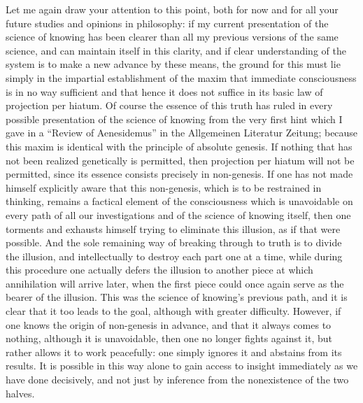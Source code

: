 Let me again draw your attention to this point,
both for now and for all your future
studies and opinions in philosophy:
if my current presentation of
the science of knowing has been clearer
than all my previous versions of the same science,
and can maintain itself in this clarity,
and if clear understanding of the system is
to make a new advance by these means,
the ground for this must lie simply
in the impartial establishment of
the maxim that immediate consciousness is
in no way sufficient and that hence
it does not suffice in its basic
law of projection per hiatum.
Of course the essence of this truth has ruled
in every possible presentation of
the science of knowing from the very first hint
which I gave in a “Review of Aenesidemus”
in the Allgemeinen Literatur Zeitung;
because this maxim is identical with
the principle of absolute genesis.
If nothing that has not been realized
genetically is permitted,
then projection per hiatum will not be permitted,
since its essence consists precisely in non-genesis.
If one has not made himself explicitly aware
that this non-genesis,
which is to be restrained in thinking,
remains a factical element of the consciousness
which is unavoidable on every path
of all our investigations
and of the science of knowing itself,
then one torments and exhausts himself
trying to eliminate this illusion,
as if that were possible.
And the sole remaining way of breaking through to
truth is to divide the illusion,
and intellectually to destroy each part one at a time,
while during this procedure one actually defers the illusion to
another piece at which annihilation will arrive later,
when the first piece could once again serve
as the bearer of the illusion.
This was the science of knowing’s previous path,
and it is clear that it too leads to the goal,
although with greater difficulty.
However, if one knows the origin of non-genesis in advance,
and that it always comes to nothing,
although it is unavoidable, then one no longer fights against it,
but rather allows it to work peacefully:
one simply ignores it and abstains from its results.
It is possible in this way alone to gain
access to insight immediately as we have done decisively,
and not just by inference from the nonexistence of the two halves.

